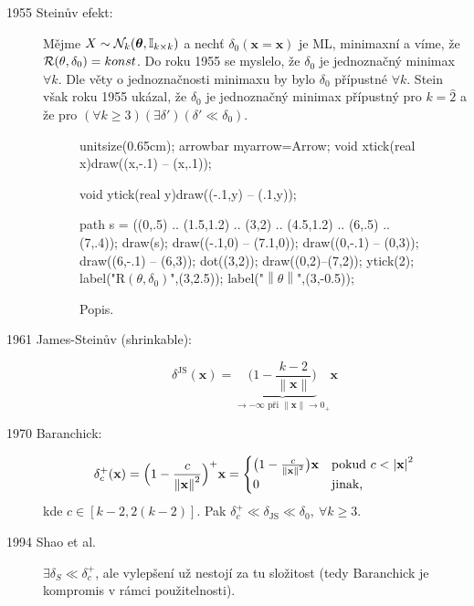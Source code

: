 \begin{description}
	\item[1955 Steinův efekt:] Mějme $X\sim \mathcal{N}_k(\boldsymbol{\theta},\mathbb{I}_{k\times k})$ a nechť $\delta_0(\textbf{x}=\textbf{x})$ je ML, minimaxní a víme, že $\mathcal{R}(\theta,\delta_0)=konst$. Do roku 1955 se myslelo, že $\delta_0$ je jednoznačný minimax $\forall k$. Dle věty o jednoznačnosti minimaxu by bylo $\delta_0$  přípustné $\forall k$. Stein však roku 1955 ukázal, že $\delta_0$ je jednoznačný minimax přípustný pro $k=\hat{2}$ a že pro $(\forall k\geq3)(\exists\delta')(\delta'\ll\delta_0)$.
	  \begin{figure}[h]
		\centering
		\begin{asy}
		unitsize(0.65cm);
		arrowbar myarrow=Arrow;
		void xtick(real x){draw((x,-.1) -- (x,.1));}
		
		void ytick(real y){draw((-.1,y) -- (.1,y));}
		
		path s = ((0,.5) .. (1.5,1.2) .. (3,2) .. (4.5,1.2) .. (6,.5) .. (7,.4));
		draw(s);
		draw((-.1,0) -- (7.1,0));
		draw((0,-.1) -- (0,3));
		draw((6,-.1) -- (6,3));
		dot((3,2));
		draw((0,2)--(7,2));
		ytick(2);
		label("$\mathrm{R}(\theta,\delta_0)$",(3,2.5));
		label("$\left\|\theta\right\|$",(3,-0.5));
		\end{asy}
		\caption{Popis.}\label{pic2}
	\end{figure}
	\item[1961 James-Steinův (shrinkable):]$$ \delta^\mathrm{JS}(\textbf{x})=\underbrace{\Big(1-\frac{k-2}{\left\|\textbf{x}\right\|}\Big)}_{\to-\infty\text{ při }\left\|\textbf{x}\right\|\to0_+}\textbf{x} $$
	\item[1970 Baranchick:] $$ \delta_c^+(\textbf{x})=\Big(1-\frac{c}{\left\|\textbf{x}\right\|^2}\Big)^+\textbf{x}=\begin{cases}
	\big(1-\frac{c}{\left\|\textbf{x}\right\|^2}\big)\textbf{x} & \text{pokud }c<\left|\textbf{x}\right|^2 \\0 & \text{jinak,}
	\end{cases} $$
	kde $c\in[k-2,2(k-2)]$. Pak $\delta_c^+\ll \delta_\mathrm{JS} \ll \delta_0,~\forall k\geq 3$.
	\item[1994 Shao et al.] $\exists \delta_S \ll \delta_c^+$, ale vylepšení už nestojí za tu složitost (tedy Baranchick je kompromis v rámci použitelnosti).
\end{description}
